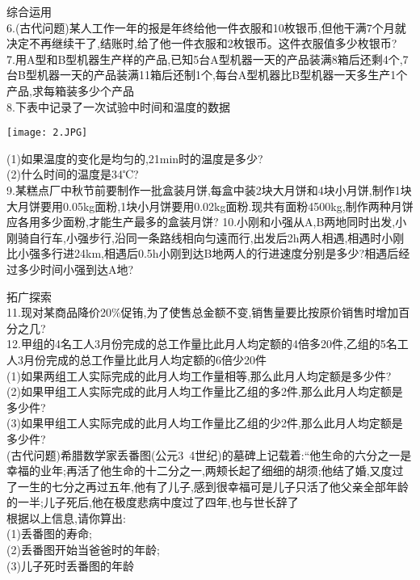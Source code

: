 \documentclass[11pt,apaper]{article}
\begin{document}
\begin{framed}
综合运用\\

6.(古代问题)某人工作一年的报是年终给他一件衣服和10枚银币,但他干满7个月就决定不再继续干了,结账时,给了他一件衣服和2枚银币。这件衣服值多少枚银币?\\
7.用A型和B型机器生产样的产品,已知5台A型机器一天的产品装满8箱后还剩4个,7台B型机器一天的产品装满11箱后还制1个,每台A型机器比B型机器一天多生产1个产品,求每箱装多少个产品\\
8.下表中记录了一次试验中时间和温度的数据\\
\begin{center}
  \texttt{[image: 2.JPG]}\\
\end{center}

(1)如果温度的变化是均匀的,21min时的温度是多少?\\
(2)什么时间的温度是34℃?\\
9.某糕点厂中秋节前要制作一批盒装月饼,每盒中装2块大月饼和4块小月饼,制作1块大月饼要用0.05kg面粉,1块小月饼要用0.02kg面粉.现共有面粉4500kg,制作两种月饼应各用多少面粉,才能生产最多的盒装月饼?
10.小刚和小强从A,B两地同时出发,小刚骑自行车,小强步行,沿同一条路线相向匀遠而行,出发后2h两人相遇,相遇时小刚比小强多行进24km,相遇后0.5h小刚到达B地两人的行进速度分别是多少?相遇后经过多少时间小强到达A地?\\

\end{framed}




\begin{framed}
拓广探索\\

11.现对某商品降价20\%促铕,为了使售总金额不变,销售量要比按原价销售时增加百分之几?\\
12.甲组的4名工人3月份完成的总工作量比此月人均定额的4倍多20件,乙组的5名工人3月份完成的总工作量比此月人均定额的6倍少20件\\
(1)如果两组工人实际完成的此月人均工作量相等,那么此月人均定额是多少件?\\
(2)如果甲组工人实际完成的此月人均工作量比乙组的多2件,那么此月人均定额是多少件?\\
(3)如果甲组工人实际完成的此月人均工作量比乙组的少2件,那么此月人均定额是多少件?\\
(古代问题)希腊数学家丢番图(公元3~4世纪)的墓碑上记载着:“他生命的六分之一是幸福的业年;再活了他生命的十二分之一,两颊长起了细细的胡须;他结了婚,又度过了一生的七分之再过五年,他有了儿子,感到很幸福可是儿子只活了他父亲全部年龄的一半;儿子死后,他在极度悲病中度过了四年,也与世长辞了\\
根据以上信息,请你算出:\\
(1)丢番图的寿命;\\
(2)丢番图开始当爸爸时的年龄;\\
(3)儿子死时丢番图的年龄\\

\end{framed}
\end{document}
